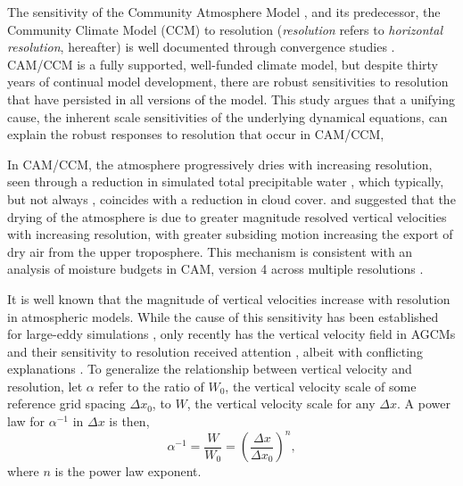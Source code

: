 \documentclass[times]{qjrms4}
\begin{document}
The sensitivity of the Community Atmosphere Model \citep[CAM;][]{CAM5}, and its predecessor, the Community Climate Model (CCM) to resolution ({\em{resolution}} refers to {\em{horizontal resolution}}, hereafter) is well documented through convergence studies \citep{KW1991JGR,WETAL1995CD,W2008TELLUS,RETAL2013JCLIM,ZetAl2014JCb,HR2017JCLIM}. CAM/CCM is a fully supported, well-funded climate model, but despite thirty years of continual model development, there are robust sensitivities to resolution that have persisted in all versions of the model. This study argues that a unifying cause, the inherent scale sensitivities of the underlying dynamical equations, can explain the robust responses to resolution that occur in CAM/CCM, {\color{red}{since it is difficult to conceive that inevitable responses to native grid resolution could be ignored in the pursuit of scale-aware physics.}}

In CAM/CCM, the atmosphere progressively dries with increasing resolution, seen through a reduction in simulated total precipitable water \citep{KW1991JGR,WETAL1995CD,W2008TELLUS,RETAL2013JCLIM,ZetAl2014JCb,HR2017JCLIM}, which typically, but not always \citep[see][]{WETAL1995CD,ZetAl2014JCb}, coincides with a reduction in cloud cover. \cite{KW1991JGR} and \cite{WETAL1995CD} suggested that the drying of the atmosphere is due to greater magnitude resolved vertical velocities with increasing resolution, with greater subsiding motion increasing the export of dry air from the upper troposphere. This mechanism is consistent with an analysis of moisture budgets in CAM, version 4 \citep[CAM4;][]{CAM4} across multiple resolutions \citep{YETAL2014JCLIM,HR2017JCLIM}.

It is well known that the magnitude of vertical velocities increase with resolution in atmospheric models. While the cause of this sensitivity has been established for large-eddy simulations \citep[see][and references therein]{J2017JAMES}, only recently has the vertical velocity field in AGCMs and their sensitivity to resolution received attention \citep{DETALA2016ACP,OETAL2016JAMES}, albeit with conflicting explanations \citep{RETAL2016CD,HR2018JAMES}. To generalize the relationship between vertical velocity and resolution, let $\alpha$ refer to the ratio of $W_0$, the vertical velocity scale of some reference grid spacing $\Delta x_0$, to $W$, the vertical velocity scale for any $\Delta x$. A power law for $\alpha^{-1}$ in $\Delta x$ is then,
\begin{equation}
\alpha^{-1} = \frac{W}{W_0} = \left( \frac{\Delta x}{\Delta x_0} \right)^n, \label{eq:alpha}
\end{equation}
where $n$ is the power law exponent. 
\end{document}
